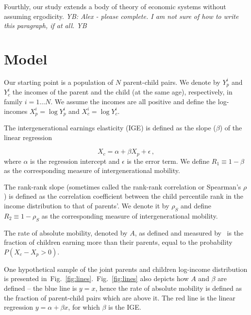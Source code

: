 \documentclass[12pt,a4paper]{article}
\newcommand{\YB}[1]{{\it YB: #1 YB}}
\newcommand{\fref}[1]{Fig.~\ref{fig:#1}}
\newcommand{\be}{\begin{equation}}
\newcommand{\ee}{\end{equation}}
\numberwithin{equation}{section}
\begin{document}
Fourthly, our study extends a body of theory of economic systems without assuming ergodicity. \YB{Alex - please complete. I am not sure of how to write this paragraph, if at all.}

\section{Model}

Our starting point is a population of $N$ parent-child pairs. We denote by $Y_p^i$ and $Y_c^i$ the incomes of the parent and the child (at the same age), respectively, in family $i=1\dots N$. We assume the incomes are all positive and define the log-incomes $X_p^i=\log Y_p^i$ and $X_c^i=\log Y_c^i$.

The intergenerational earnings elasticity (IGE) is defined as the slope ($\beta$) of the linear regression

\be
X_c = \alpha + \beta X_p + \epsilon\,,
\ee
where $\alpha$ is the regression intercept and $\epsilon$ is the error term. We define $R_1\equiv 1- \beta$ as the corresponding measure of intergenerational mobility.

The rank-rank slope (sometimes called the rank-rank correlation or Spearman's $\rho$) is defined as the correlation coefficient between the child percentile rank in the income distribution to that of parents'. We denote it by $\rho_S$ and define $R_2\equiv 1- \rho_S$ as the corresponding measure of intergenerational mobility.

The rate of absolute mobility, denoted by $A$, as defined and measured by~\citet{chetty2017fading} is the fraction of children earning more than their parents, equal to the probability $P\left(X_c-X_p > 0\right)$.

One hypothetical sample of the joint parents and children log-income distribution is presented in~\fref{lines}.~\fref{lines} also depicts how $A$ and $\beta$ are defined -- the blue line is $y=x$, hence the rate of absolute mobility is defined as the fraction of parent-child pairs which are above it. The red line is the linear regression $y=\alpha +\beta x$, for which $\beta$ is the IGE.
\end{document}
